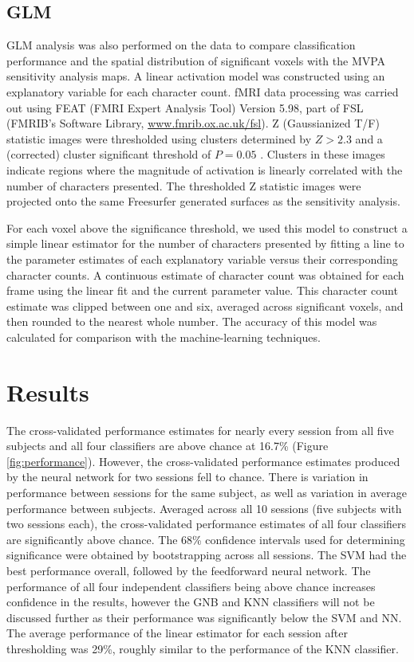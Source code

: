 \documentclass[5p,authoryear]{elsarticle}
\begin{document}
\subsection{GLM}
GLM analysis was also performed on the data to compare classification performance and the spatial distribution of significant voxels with the MVPA sensitivity analysis maps. 
A linear activation model was constructed using an explanatory variable for each character count.
fMRI data processing was carried out using FEAT (FMRI Expert Analysis Tool) Version 5.98, part of FSL (FMRIB's Software Library, \url{www.fmrib.ox.ac.uk/fsl}). 
Z (Gaussianized T/F) statistic images were thresholded using clusters determined by $Z > 2.3$ and a (corrected) cluster significant threshold of $P = 0.05$ \citep{Worsley2001}.
Clusters in these images indicate regions where the magnitude of activation is linearly correlated with the number of characters presented.
The thresholded Z statistic images were projected onto the same Freesurfer generated surfaces as the sensitivity analysis.

For each voxel above the significance threshold, we used this model to construct a simple linear estimator for the number of characters presented by fitting a line to the parameter estimates of each explanatory variable versus their corresponding character counts.
A continuous estimate of character count was obtained for each frame using the linear fit and the current parameter value.
This character count estimate was clipped between one and six, averaged across significant voxels, and then rounded to the nearest whole number.
The accuracy of this model was calculated for comparison with the machine-learning techniques.

\section{Results}
The cross-validated performance estimates for nearly every session from all five subjects and all four classifiers are above chance at 16.7\% (Figure \ref{fig:performance}).
However, the cross-validated performance estimates produced by the neural network for two sessions fell to chance.
There is variation in performance between sessions for the same subject, as well as variation in average performance between subjects.
Averaged across all 10 sessions (five subjects with two sessions each), the cross-validated performance estimates of all four classifiers are significantly above chance.
The 68\% confidence intervals used for determining significance were obtained by bootstrapping across all sessions.
The SVM had the best performance overall, followed by the feedforward neural network.
The performance of all four independent classifiers being above chance increases confidence in the results, however the GNB and KNN classifiers will not be discussed further as their performance was significantly below the SVM and NN.
The average performance of the linear estimator for each session after thresholding was 29\%, roughly similar to the performance of the KNN classifier.
\end{document}
